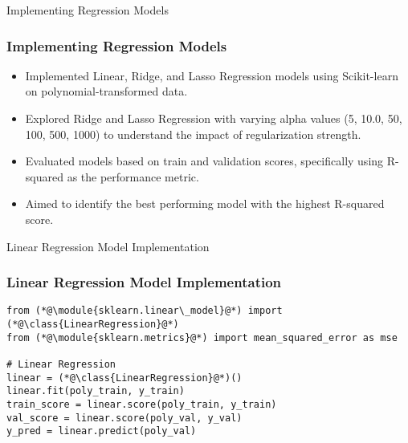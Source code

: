 \begin{frame}{Implementing Regression Models}
    \frametitle{Implementing Regression Models}
    \begin{itemize}
        \item Implemented Linear, Ridge, and Lasso Regression models using Scikit-learn on polynomial-transformed data.
        \item Explored Ridge and Lasso Regression with varying alpha values (5, 10.0, 50, 100, 500, 1000) to understand the impact of regularization strength.
        \item Evaluated models based on train and validation scores, specifically using R-squared as the performance metric.
        \item Aimed to identify the best performing model with the highest R-squared score.
    \end{itemize}
\end{frame}

\begin{frame}[fragile]{Linear Regression Model Implementation}
    \frametitle{Linear Regression Model Implementation}
    \begin{lstlisting}[caption={Implementing Linear Regression using sklearn.linear\_model.}, label=lst:linear_regression_implementation]
from (*@\module{sklearn.linear\_model}@*) import (*@\class{LinearRegression}@*)
from (*@\module{sklearn.metrics}@*) import mean_squared_error as mse

# Linear Regression
linear = (*@\class{LinearRegression}@*)()
linear.fit(poly_train, y_train)
train_score = linear.score(poly_train, y_train)
val_score = linear.score(poly_val, y_val)
y_pred = linear.predict(poly_val)
    \end{lstlisting}
\end{frame}


        



